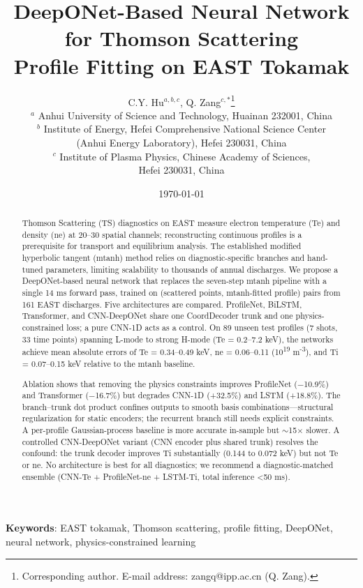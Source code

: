 \documentclass[a4paper,12pt]{article}
\title{DeepONet-Based Neural Network for Thomson Scattering \\ Profile Fitting on EAST Tokamak}
\author{%
C.Y. Hu$^{a,b,c}$, Q. Zang$^{c,\ast}$\thanks{Corresponding author. E-mail address: zangq@ipp.ac.cn (Q. Zang).} \\[4pt]
$^a$ Anhui University of Science and Technology, Huainan 232001, China \\
$^b$ Institute of Energy, Hefei Comprehensive National Science Center \\
(Anhui Energy Laboratory), Hefei 230031, China \\
$^c$ Institute of Plasma Physics, Chinese Academy of Sciences, \\
Hefei 230031, China
}
\date{\today}
\begin{document}
\maketitle


\begin{abstract}
\small
Thomson Scattering (TS) diagnostics on EAST measure electron temperature (Te) and density (ne) at 20--30 spatial channels; reconstructing continuous profiles is a prerequisite for transport and equilibrium analysis. The established modified hyperbolic tangent (mtanh) method relies on diagnostic-specific branches and hand-tuned parameters, limiting scalability to thousands of annual discharges. We propose a DeepONet-based neural network that replaces the seven-step mtanh pipeline with a single 14 ms forward pass, trained on (scattered points, mtanh-fitted profile) pairs from 161 EAST discharges. Five architectures are compared. ProfileNet, BiLSTM, Transformer, and CNN-DeepONet share one CoordDecoder trunk and one physics-constrained loss; a pure CNN-1D acts as a control. On 89 unseen test profiles (7 shots, 33 time points) spanning L-mode to strong H-mode (Te = 0.2--7.2 keV), the networks achieve mean absolute errors of Te = 0.34--0.49 keV, ne = 0.06--0.11 (10\textsuperscript{19} m\textsuperscript{-3}), and Ti = 0.07--0.15 keV relative to the mtanh baseline.

Ablation shows that removing the physics constraints improves ProfileNet ($-$10.9\%) and Transformer ($-$16.7\%) but degrades CNN-1D (+32.5\%) and LSTM (+18.8\%). The branch--trunk dot product confines outputs to smooth basis combinations---structural regularization for static encoders; the recurrent branch still needs explicit constraints. A per-profile Gaussian-process baseline is more accurate in-sample but $\sim$15$\times$ slower. A controlled CNN-DeepONet variant (CNN encoder plus shared trunk) resolves the confound: the trunk decoder improves Ti substantially (0.144 to 0.072 keV) but not Te or ne. No architecture is best for all diagnostics; we recommend a diagnostic-matched ensemble (CNN-Te + ProfileNet-ne + LSTM-Ti, total inference <50 ms).

\end{abstract}

\noindent\textbf{Keywords}: EAST tokamak, Thomson scattering, profile fitting, DeepONet, neural network, physics-constrained learning
\end{document}
